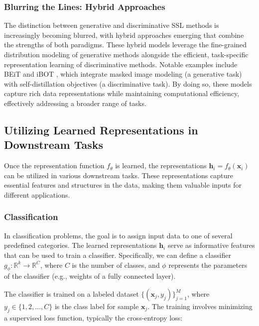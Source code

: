 \subsubsection{Blurring the Lines: Hybrid Approaches}

The distinction between generative and discriminative SSL methods is increasingly becoming blurred, with hybrid approaches emerging that combine the strengths of both paradigms. These hybrid models leverage the fine-grained distribution modeling of generative methods alongside the efficient, task-specific representation learning of discriminative methods. Notable examples include BEiT \citep{bao2021beit} and iBOT \citep{zhou2022ibot}, which integrate masked image modeling (a generative task) with self-distillation objectives (a discriminative task). By doing so, these models capture rich data representations while maintaining computational efficiency, effectively addressing a broader range of tasks.

  


  


\subsection{Utilizing Learned Representations in Downstream Tasks}

Once the representation function \( f_{\theta} \) is learned, the representations \( \mathbf{h}_i = f_{\theta}(\mathbf{x}_i) \) can be utilized in various downstream tasks. These representations capture essential features and structures in the data, making them valuable inputs for different applications.

\subsubsection{Classification}

In classification problems, the goal is to assign input data to one of several predefined categories. The learned representations \( \mathbf{h}_i \) serve as informative features that can be used to train a classifier. Specifically, we can define a classifier \( g_{\phi} : \mathbb{R}^k \rightarrow \mathbb{R}^C \), where \( C \) is the number of classes, and \( \phi \) represents the parameters of the classifier (e.g., weights of a fully connected layer).

The classifier is trained on a labeled dataset \( \{ (\mathbf{x}_j, y_j) \}_{j=1}^M \), where \( y_j \in \{1, 2, \dots, C\} \) is the class label for sample \( \mathbf{x}_j \). The training involves minimizing a supervised loss function, typically the cross-entropy loss:

